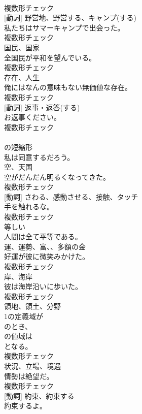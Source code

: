 \documentclass[8pt]{extreport}
\begin{document}
\begin{CJK}{UTF8}{min}
\\	複数形チェック
\\	[名詞] [動詞]	野営地、野営する、キャンプ(する)	
\\	私たちはサマーキャンプで出会った。	
\\	複数形チェック
\\	[名詞]	国民、国家	
\\	全国民が平和を望んでいる。	
\\	複数形チェック
\\	[名詞]	存在、人生	
\\	俺にはなんの意味もない無価値な存在。	
\\	複数形チェック
\\	[名詞] [動詞]	返事・返答(する)	
\\	お返事ください。	
\\	複数形チェック
\\	[短縮形]	
\\	の短縮形	
\\	私は同意するだろう。	
\\	[名詞]	空、天国	
\\	空がだんだん明るくなってきた。	
\\	複数形チェック
\\	[名詞] [動詞]	さわる、感動させる、接触、タッチ	
\\	手を触れるな。	
\\	複数形チェック
\\	[形容詞]	等しい	
\\	人間は全て平等である。	
\\	[名詞]	運、運勢、富、、多額の金	
\\	好運が彼に微笑みかけた。	
\\	複数形チェック
\\	[名詞]	岸、海岸	
\\	彼は海岸沿いに歩いた。	
\\	複数形チェック
\\	[名詞]	領地、領土、分野	
\\	1の定義域が
\\	のとき、
\\	の値域は
\\	となる。	
\\	複数形チェック
\\	[名詞]	状況、立場、境遇	
\\	情勢は絶望だ。	
\\	複数形チェック
\\	[名詞] [動詞]	約束、約束する	
\\	約束するよ。	

\end{CJK}
\end{document}
